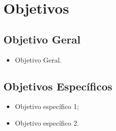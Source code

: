 \chapter{Objetivos}
\label{chap:objetivos}

\section{Objetivo Geral}

\begin{itemize}
    \item Objetivo Geral.
\end{itemize}

\section{Objetivos Específicos}

\begin{itemize}
    \item Objetivo específico 1;
    \item Objetivo específico 2.
\end{itemize}